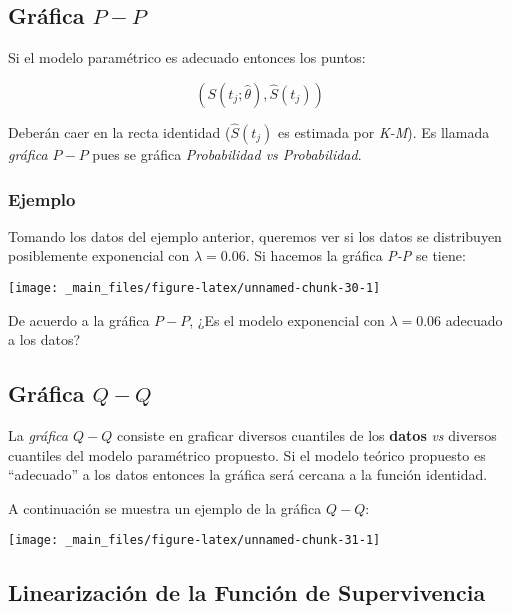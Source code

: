 \documentclass[
  a4paper,
  oneside,
  openany]{book}
\begin{document}
\hypertarget{gruxe1fica-p-p}{%
\subsection{\texorpdfstring{Gráfica \(P-P\)}{Gráfica P-P}}\label{gruxe1fica-p-p}}

Si el modelo paramétrico es adecuado entonces los puntos:

\[
\left(S(t_j ;\hat{\theta}),\hat S(t_j)\right)
\]

Deberán caer en la recta identidad (\(\hat S(t_j)\) es estimada por \emph{K-M}). Es llamada \emph{gráfica \(P-P\)} pues se gráfica \emph{Probabilidad vs Probabilidad}.

\hypertarget{ejemplo-13}{%
\subsubsection*{Ejemplo}\label{ejemplo-13}}


Tomando los datos del ejemplo anterior, queremos ver si los datos se distribuyen posiblemente exponencial con \(\lambda =0.06\). Si hacemos la gráfica \emph{P-P} se tiene:

\begin{center}\texttt{[image: \_main\_files/figure-latex/unnamed-chunk-30-1]} \end{center}

De acuerdo a la gráfica \emph{\(P-P\)}, ¿Es el modelo exponencial con \(\lambda=0.06\) adecuado a los datos?

\hypertarget{gruxe1fica-q-q}{%
\subsection{\texorpdfstring{Gráfica \(Q-Q\)}{Gráfica Q-Q}}\label{gruxe1fica-q-q}}

La \emph{gráfica \(Q-Q\)} consiste en graficar diversos cuantiles de los \textbf{datos} \emph{vs} diversos cuantiles del modelo paramétrico propuesto. Si el modelo teórico propuesto es ``adecuado'' a los datos entonces la gráfica será cercana a la función identidad.

A continuación se muestra un ejemplo de la gráfica \(Q-Q\):

\begin{center}\texttt{[image: \_main\_files/figure-latex/unnamed-chunk-31-1]} \end{center}

\hypertarget{linearizaciuxf3n-de-la-funciuxf3n-de-supervivencia}{%
\subsection{Linearización de la Función de Supervivencia}\label{linearizaciuxf3n-de-la-funciuxf3n-de-supervivencia}}
\end{document}
